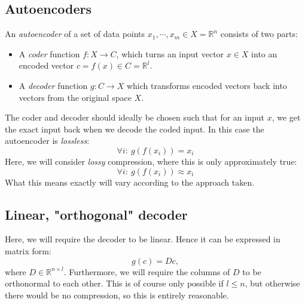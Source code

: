 \documentclass[12pt, a4paper]{article}
\numberwithin{equation}{section}
\begin{document}
\subsection{Autoencoders}
An \textit{autoencoder} of a set of data points $x_1,\cdots, x_m\in X=\mathbb{R}^n$ consists of two parts:
\begin{itemize}
\item A \textit{coder} function $f: X\rightarrow C$, which turns an input vector $x\in X$ into an encoded vector $c=f(x)\in C=\mathbb{R}^l$.
\item A \textit{decoder} function $g: C\rightarrow X$ which transforms encoded vectors back into vectors from the original space $X$.
\end{itemize}
The coder and decoder should ideally be chosen such that for an input $x$, we get the exact input back when we decode the coded input. In this case the autoencoder is \textit{lossless}:
\begin{equation}
\forall i:\ g(f(x_i))=x_i
\end{equation}
Here, we will consider \textit{lossy} compression, where this is only approximately true:
\begin{equation}
\forall i:\ g(f(x_i))\approx x_i
\end{equation} 
What this means exactly will vary according to the approach taken.

\subsection{Linear, "orthogonal" decoder}
Here, we will require the decoder to be linear. Hence it can be expressed in matrix form:
\begin{equation}
g(c)=Dc,
\end{equation}
where $D\in\mathbb{R}^{n\times l}$. Furthermore, we will require the columns of $D$ to be orthonormal to each other. This is of course only possible if $l\le n$, but otherwise there would be no compression, so this is entirely reasonable.
\end{document}
